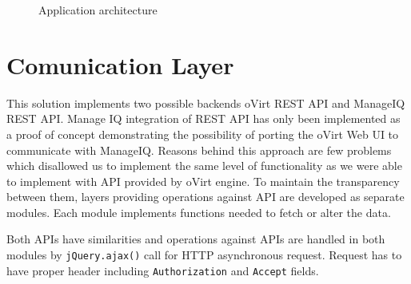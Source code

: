 \begin{figure}[h]
\caption{Application architecture}
\label{vector}
\end{figure}

\section{Comunication Layer}
This solution implements two possible backends oVirt REST API and ManageIQ REST API. Manage IQ integration of REST API has only been implemented as a proof of concept demonstrating the possibility of porting the oVirt Web UI to communicate with ManageIQ. Reasons behind this approach are few problems which disallowed us to implement the same level of functionality as we were able to implement with API provided by oVirt engine. To maintain the transparency between them, layers providing operations against API are developed as separate modules. Each module implements functions needed to fetch or alter the data.

Both APIs have similarities and operations against APIs are handled in both modules by \texttt{jQuery.ajax()}\cite{ajax} call for HTTP asynchronous request.
Request has to have proper header including \texttt{Authorization} and \texttt{Accept} fields. 



